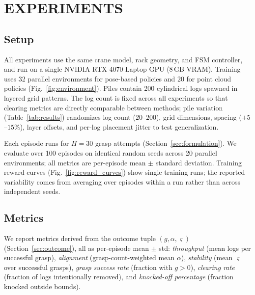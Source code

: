 \documentclass[letterpaper, 10 pt, conference]{ieeeconf}
\begin{document}
\section{EXPERIMENTS}
\subsection{Setup}
All experiments use the same crane model, rack geometry, and FSM controller, and run on a single NVIDIA RTX 4070 Laptop GPU (8\,GB VRAM).
Training uses 32 parallel environments for pose-based policies and 20 for point cloud policies (Fig.~\ref{fig:environment}).
Piles contain 200 cylindrical logs spawned in layered grid patterns.
The log count is fixed across all experiments so that clearing metrics are directly comparable between methods; pile variation (Table~\ref{tab:results}) randomizes log count ($20$--$200$), grid dimensions, spacing ($\pm 5$--$15$\%), layer offsets, and per-log placement jitter to test generalization.

Each episode runs for $H=30$ grasp attempts (Section~\ref{sec:formulation}). We evaluate over 100 episodes on identical random seeds across 20 parallel environments; all metrics are per-episode mean $\pm$ standard deviation.
Training reward curves (Fig.~\ref{fig:reward_curves}) show single training runs; the reported variability comes from averaging over episodes within a run rather than across independent seeds.

\subsection{Metrics}
\label{sec:metrics}
We report metrics derived from the outcome tuple $(g, \alpha, \varsigma)$ (Section~\ref{sec:outcome}), all as per-episode mean $\pm$ std: \emph{throughput} (mean logs per successful grasp), \emph{alignment} (grasp-count-weighted mean $\alpha$), \emph{stability} (mean $\varsigma$ over successful grasps), \emph{grasp success rate} (fraction with $g>0$), \emph{clearing rate} (fraction of logs intentionally removed), and \emph{knocked-off percentage} (fraction knocked outside bounds).
\end{document}
